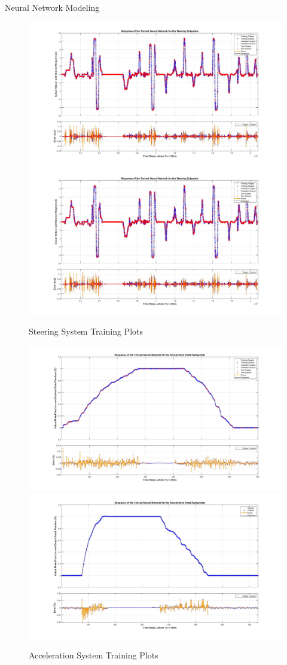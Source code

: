 \documentclass[final]{beamer}
\newlength{\onecolwid}
\begin{document}
\begin{frame}[t]
\begin{columns}[t]
\begin{column}{\onecolwid}
\begin{block}{Neural Network Modeling}
\begin{figure}
    \centering
		{\includegraphics[width=0.48\linewidth]{figs/img/steeringNeuralNetworkTrainedOutput}}
		{\includegraphics[width=0.48\linewidth]{figs/img/steeringNeuralNetworkTrainedOutput}}
	\caption{Steering System Training Plots}
    \label{fig:SteeringSysNeuralNetwork}
\end{figure}

\begin{figure}
    \centering
		{\includegraphics[width=0.48\linewidth]{figs/img/accelNeuralNetworkTrainedOutput}}
		{\includegraphics[width=0.48\linewidth]{figs/img/accelNeuralNetworkTrainedOutput2}}
	\caption{Acceleration System Training Plots}
    \label{fig:AccelerationSysNeuralNetwork}
\end{figure}


\end{block}
\end{column}
\end{columns}
\end{frame}
\end{document}

